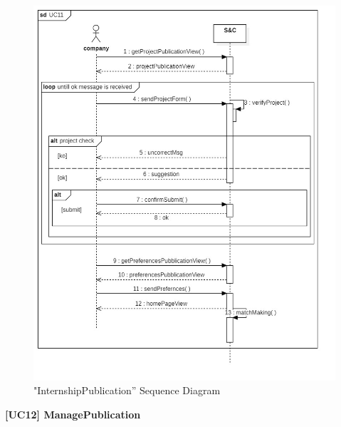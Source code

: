 \documentclass{article}
\begin{document}
\begin{figure}[H]
    \centering
    \includegraphics[width=1\linewidth]{sequenceDiagrams/UC11.jpg}
    \caption{"InternshipPublication” Sequence Diagram}
    \label{fig:enter-label}
\end{figure}
\vspace{1cm}
\textbf{[UC12] ManagePublication}
\end{document}
